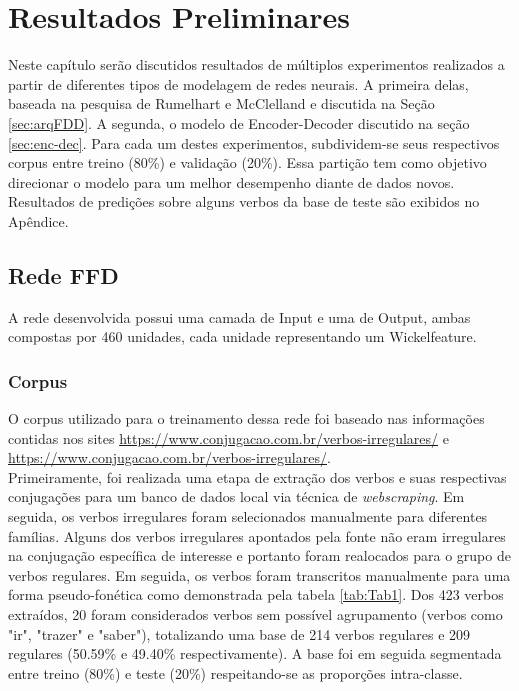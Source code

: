 \chapter{Resultados Preliminares}
\label{ch:03-results}


Neste capítulo serão discutidos resultados de múltiplos experimentos realizados a partir de diferentes tipos de modelagem de redes neurais. A primeira delas, baseada na pesquisa de Rumelhart e McClelland e discutida na Seção \ref{sec:arqFDD}.
A segunda, o modelo de Encoder-Decoder discutido na seção \ref{sec:enc-dec}. Para cada um destes experimentos, subdividem-se seus respectivos corpus entre treino (80\%) e validação (20\%). Essa partição tem como objetivo direcionar o modelo para um melhor desempenho diante de dados novos. Resultados de predições sobre alguns verbos da base de teste são exibidos no Apêndice. 

\section{Rede FFD}
\label{sec:ffd}

A rede desenvolvida possui uma camada de Input e uma de Output, ambas compostas por 460 unidades, cada unidade representando um Wickelfeature.

\subsection{Corpus}
\label{sec:corpus-ffd}

O corpus utilizado para o treinamento dessa rede foi baseado nas informações contidas nos sites \url{https://www.conjugacao.com.br/verbos-irregulares/} e \url{https://www.conjugacao.com.br/verbos-irregulares/}.\\

Primeiramente, foi realizada uma etapa de extração dos verbos e suas respectivas conjugações para um banco de dados local via técnica de \textit{webscraping}. Em seguida, os verbos irregulares foram selecionados manualmente para diferentes famílias. Alguns dos verbos irregulares apontados pela fonte não eram irregulares na conjugação específica de interesse e portanto foram realocados para o grupo de verbos regulares. Em seguida, os verbos foram transcritos manualmente para uma forma pseudo-fonética como demonstrada pela tabela \ref{tab:Tab1}. Dos 423 verbos extraídos, 20 foram considerados verbos sem possível agrupamento (verbos como "ir", "trazer" e "saber"), totalizando uma base de 214 verbos regulares e 209 regulares (50.59\% e 49.40\% respectivamente). A base foi em seguida segmentada entre treino (80\%) e teste (20\%) respeitando-se as proporções intra-classe.  


